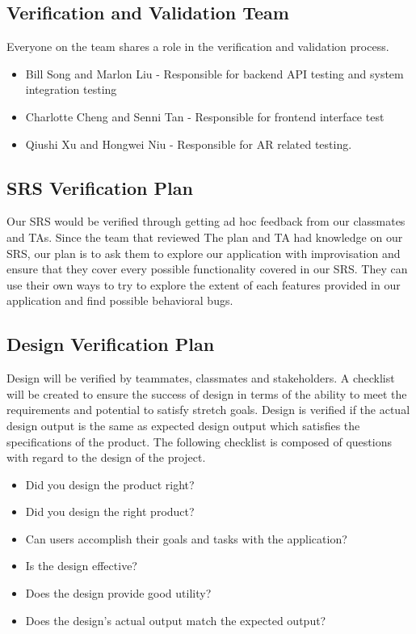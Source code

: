 \documentclass[12pt, titlepage]{article}
\begin{document}
\subsection{Verification and Validation Team}

\noindent
Everyone on the team shares a role in the verification and validation process.
\begin{itemize}
    \item Bill Song and Marlon Liu - Responsible for backend API testing and system integration testing
    \item Charlotte Cheng and Senni Tan - Responsible for frontend interface test
    \item Qiushi Xu and Hongwei Niu - Responsible for AR related testing. 
\end{itemize} 

 

\subsection{SRS Verification Plan}

 
\noindent
Our SRS would be verified through getting ad hoc feedback from our classmates and TAs. Since the team that reviewed The plan and TA had knowledge on our SRS, our plan is to ask them to explore our application with improvisation and ensure that they cover every possible functionality covered in our SRS. They can use their own ways to try to explore the extent of each features provided in our application and find possible behavioral bugs. 

\subsection{Design Verification Plan}

Design will be verified by teammates, classmates and stakeholders. A checklist will be created to ensure the success of design in terms of the ability to meet the requirements and potential to satisfy stretch goals. Design is verified if the actual design output is the same as expected design output which satisfies the specifications of the product. The following checklist is composed of questions with regard to the design of the project.
\begin{itemize}
    \item Did you design the product right?
    \item Did you design the right product?
    \item Can users accomplish their goals and tasks with the application?
    \item Is the design effective?
    \item Does the design provide good utility?
    \item Does the design's actual output match the expected output?
\end{itemize}
\end{document}
